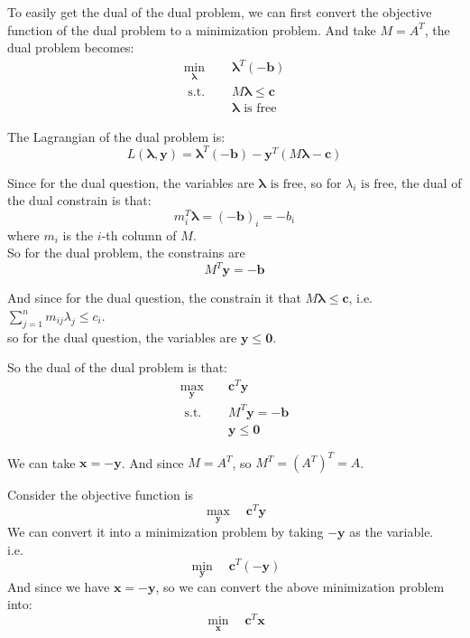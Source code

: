 \documentclass[10pt]{article}
\begin{document}
To easily get the dual of the dual problem, we can first convert the objective function of the dual problem to a minimization problem. And take $M=A^T$,
the dual problem becomes:
\begin{equation}
\begin{aligned}
\min_{\bm{\lambda}} \quad & \bm{\lambda}^T\bm{(-b)} \\
\text { s.t. } \quad & M\bm{\lambda} \leq \bm{c} \\
& \bm{\lambda} \text{ is free}
\end{aligned}
\end{equation}

The Lagrangian of the dual problem is:\\
$$L(\bm{\lambda},\bm{y}) = \bm{\lambda}^T\bm{(-b)} - \bm{y}^T(M\bm{\lambda} - \bm{c})$$


Since for the dual question, the variables are $\bm{\lambda}\text{ is free}$, so for $\lambda_i\text{ is free}$, the dual of the dual constrain is that:\\
$$m_i^T\bm{\lambda} = (-\bm{b})_i = -b_i$$
where $m_i$ is the $i$-th column of $M$.\\

So for the dual problem, the constrains are
$$M^T\bm{y} = \bm{-b}$$

And since for the dual question, the constrain it that $M\bm{\lambda} \leq \bm{c}$, i.e.$\sum\limits_{j=1}^nm_{ij}\lambda_j\leq c_i$.\\
so for the dual question, the variables are $\bm{y}\leq\bm{0}$.

So the dual of the dual problem is that:\\
\begin{equation}
\begin{aligned}
\max_{\bm{y}} \quad & \bm{c}^T\bm{y} \\
\text { s.t. } \quad & M^T\bm{y} = \bm{-b} \\
& \bm{y} \leq \bm{0}
\end{aligned}
\end{equation}

We can take $\bm{x}=-\bm{y}$. And since $M=A^T$, so $M^T=(A^T)^T=A$.

Consider the objective function is 
$$\max\limits_{\bm{y}} \quad \bm{c}^T\bm{y}$$
We can convert it into a minimization problem by taking $-\bm{y}$ as the variable.\\
i.e.
$$\min\limits_{\bm{y}} \quad \bm{c}^T\bm{(-y)}$$
And since we have $\bm{x}=-\bm{y}$, so we can convert the above minimization problem into:
$$\min\limits_{\bm{x}} \quad \bm{c}^T\bm{x}$$
\end{document}
